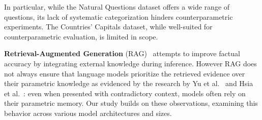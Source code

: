 In particular, while the Natural Questions dataset offers a wide range of questions, its lack of systematic categorization hinders counterparametric experiments.
The Countries' Capitals dataset, while well-suited for counterparametric evaluation, is limited in scope.

\textbf{Retrieval-Augmented Generation} (RAG)~\cite{rag} attempts to improve factual accuracy by integrating external knowledge during inference.
However RAG does not always ensure that language models prioritize the retrieved evidence over their parametric knowledge as evidenced by the research by Yu et al.~\cite{factual_recall} and Hsia et al.~\cite{ragged}: even when presented with contradictory context, models often rely on their parametric memory.
Our study builds on these observations, examining this behavior across various model architectures and sizes.
